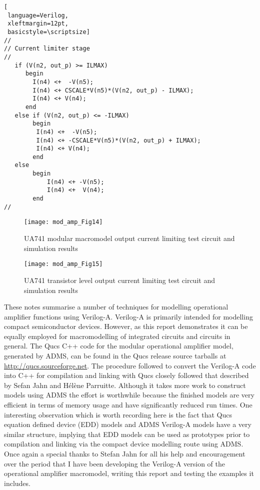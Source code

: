 \begin{lstlisting}[
 language=Verilog, 
 xleftmargin=12pt,
 basicstyle=\scriptsize]
//
// Current limiter stage
//
   if (V(n2, out_p) >= ILMAX) 
      begin
        I(n4) <+  -V(n5);
        I(n4) <+ CSCALE*V(n5)*(V(n2, out_p) - ILMAX);
        I(n4) <+ V(n4);
      end
   else if (V(n2, out_p) <= -ILMAX)
        begin
         I(n4) <+  -V(n5);
         I(n4) <+ -CSCALE*V(n5)*(V(n2, out_p) + ILMAX);
         I(n4) <+ V(n4);
        end
   else
        begin
            I(n4) <+ -V(n5);
            I(n4) <+  V(n4);
        end
//
\end{lstlisting}

\begin{figure} [h]
  \centering
  \texttt{[image: mod\_amp\_Fig14]}
  \caption{UA741 modular macromodel output current limiting test circuit and simulation results}
  \label{fig:mod_amp14}
\end{figure} 


\begin{figure} [h]
  \centering
  \texttt{[image: mod\_amp\_Fig15]}
  \caption{UA741 transistor level output current limiting test circuit and simulation results}
  \label{fig:mod_amp15}
\end{figure} 



These notes summarise a number of techniques for modelling operational
amplifier functions using Verilog-A.  Verilog-A is primarily intended
for modelling compact semiconductor devices.  However, as this report
demonstrates it can be equally employed for macromodelling of
integrated circuits and circuits in general. The Qucs C++ code for the
modular operational amplifier model, generated by ADMS, can be found
in the Qucs release source tarballs at
\url{http://qucs.sourceforge.net}.  The procedure followed to convert
the Verilog-A code into C++ for compilation and linking with Qucs
closely followed that described by Sefan Jahn and H\'{e}l\`{e}ne
Parruitte.  Although it takes more work to construct models using ADMS
the effort is worthwhile because the finished models are very efficient
in terms of memory usage and have significantly reduced run times. One
interesting observation which is worth recording here is the fact that
Qucs equation defined device (EDD) models and ADMS Verilog-A models
have a very similar structure, implying that EDD models can be used as
prototypes prior to compilation and linking via the compact device
modelling route using ADMS. Once again a special thanks to Stefan Jahn
for all his help and encouragement over the period that I have been
developing the Verilog-A version of the operational amplifier
macromodel, writing this report and testing the examples it includes.
